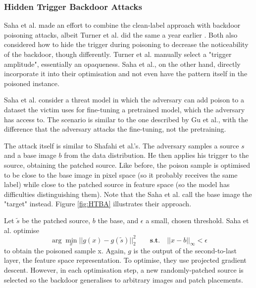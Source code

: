 \documentclass[review]{AIM_report}
\begin{document}
\subsubsection{Hidden Trigger Backdoor Attacks}
Saha et al. \cite{saha2020hidden}
made an effort to combine the clean-label approach with backdoor poisoning attacks, albeit Turner et al. did the same a year earlier \cite{turner2019label}. Both also considered how to hide the trigger during poisoning to decrease the noticeability of the backdoor, though differently. Turner et al. manually select a "trigger amplitude", essentially an opaqueness. Saha et al., on the other hand, directly incorporate it into their optimisation and not even have the pattern itself in the poisoned instance. 

Saha et al. consider a threat model in which the adversary can add poison to a dataset the victim uses for fine-tuning a pretrained model, which the adversary has access to. The scenario is similar to the one described by Gu et al., with the difference that the adversary attacks the fine-tuning, not the pretraining.

The attack itself is similar to Shafahi et al.'s. The adversary samples a source \(s\) and a base image \(b\) from the data distribution. He then applies his trigger to the source, obtaining the patched source. Like before, the poison sample is optimised to be close to the base image in pixel space (so it probably receives the same label) while close to the patched source in feature space (so the model has difficulties distinguishing them). Note that the Saha et al. call the base image the "target" instead. Figure \ref{fig:HTBA} illustrates their approach.

Let \(\tilde{s}\) be the patched source, \(b\) the base, and \(\epsilon\) a small, chosen threshold. Saha et al. optimise
\[
\arg\min_x{\lvert \lvert g(x) - g(\tilde{s}) \rvert \rvert_{2}^2} \quad\quad \textbf{s.t.} \quad \lvert \lvert x - b \rvert \rvert_{\infty} < \epsilon
\]
to obtain the poisoned sample x. Again, \(g\) is the output of the second-to-last layer, the feature space representation.
To optimise, they use projected gradient descent. However, in each optimisation step, a new randomly-patched source is selected so the backdoor generalises to arbitrary images and patch placements. %
\end{document}
